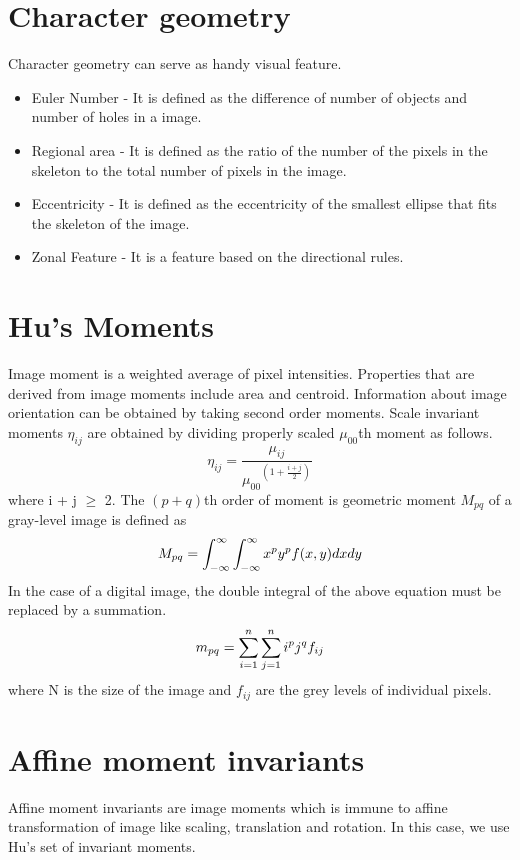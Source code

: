 \section{Character geometry}
Character geometry can serve as handy visual feature\cite{dileep}.
       \begin{itemize}
\item Euler Number - It is defined as the difference of number of objects and number of holes in a image.
 \item Regional area - It is defined as the ratio of the number of
the pixels in the skeleton to the total number of pixels in the image.
 \item Eccentricity - It is defined as the eccentricity of the
smallest ellipse that fits the skeleton of the image.
 \item Zonal Feature - It is a feature based on the directional rules.
        \end{itemize}
\section{Hu's Moments}
Image moment is a weighted average of pixel intensities. Properties that are derived from image moments include area and centroid. Information about image orientation can be obtained 
by taking second order moments. Scale invariant moments $\eta_{ij}$ are obtained by dividing properly scaled
$\mu_{00}$th moment as follows.
\begin{equation}
\eta_{ij} = \frac{\mu_{ij}}{{\mu_{00}}^{(1+\frac{i+j}{2})}}
\end{equation}
where i + j $\ge$ 2.
The $(p+q)$th order of moment is geometric moment $M_{pq}$ of a gray-level image is defined as
\begin{equation}
M_{pq} = \int_{-\infty}^\infty\int_{-\infty}^\infty x^py^pf(x,y)dxdy\\
\end{equation}
In the case of a digital image, the double integral of the above equation must be replaced by a summation\cite{flusser1}.\\
\begin{equation}
m_{pq}=\sum_{i=1}^n\sum_{j=1}^ni^pj^qf_{ij}\\
\end{equation}
where N is the size of the image and $f_{ij}$ are the grey levels of individual pixels.

\section{Affine moment invariants}
Affine moment invariants are image moments which is immune to affine transformation of image like
scaling, translation and rotation. In this case, we use Hu's set of invariant moments\cite{flusser2}.

